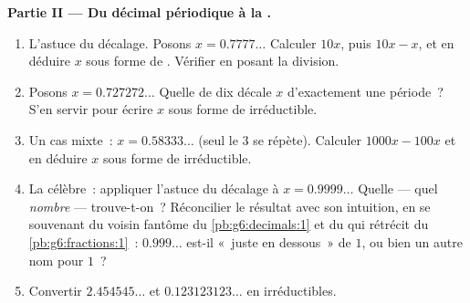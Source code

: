 \begin{problem}
\medskip
\noindent\textbf{Partie II --- Du décimal périodique à la .}
\begin{enumerate}[resume]
  \item L'astuce du décalage. Posons $x = 0.7777\ldots$ Calculer
        $10x$, puis $10x - x$, et en déduire $x$ sous forme de
        . Vérifier en posant la division.
  \item Posons $x = 0.727272\ldots$ Quelle  de dix décale
        $x$ d'exactement une période~? S'en servir pour écrire $x$
        sous forme de  irréductible.
  \item Un cas mixte~: $x = 0.58333\ldots$ (seul le $3$ se répète).
        Calculer $1000x - 100x$ et en déduire $x$ sous forme de
         irréductible.
  \item La célèbre~: appliquer l'astuce du décalage à
        $x = 0.9999\ldots$ Quelle  --- quel \emph{nombre}
        --- trouve-t-on~? Réconcilier le résultat avec son
        intuition, en se souvenant du voisin fantôme du
        \cref{pb:g6:decimals:1} et du  qui rétrécit du
        \cref{pb:g6:fractions:1}~: $0.999\ldots$ est-il «~juste en
        dessous~» de $1$, ou bien un autre nom pour $1$~?
  \item Convertir $2.454545\ldots$ et $0.123123123\ldots$ en
         irréductibles.
\end{enumerate}


\end{problem}
